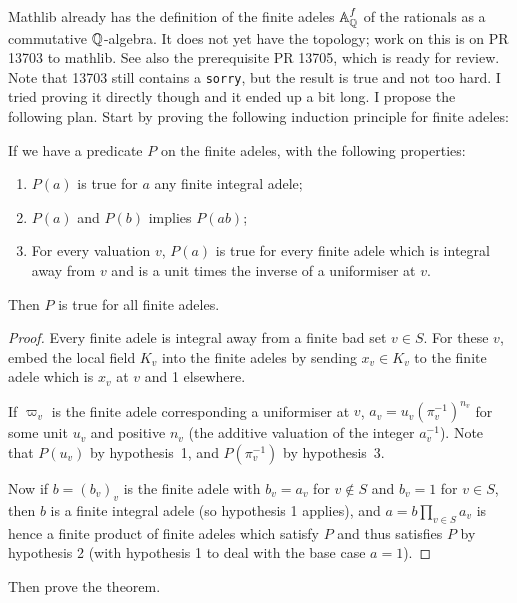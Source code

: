 Mathlib already has the definition of the finite adeles $\mathbb{A}_{\mathbb{Q}}^f$ of the rationals as a
commutative $\mathbb{Q}$-algebra. It does not yet have the topology; work on this is on PR 13703 to mathlib.
See also the prerequisite PR 13705, which is ready for review. Note that 13703 still contains a
{\tt sorry}, but the result is true and not too hard. I tried proving it directly though and it ended
up a bit long. I propose the following plan. Start by proving the following induction principle for
finite adeles:
\begin{lemma}
    \label{DedekindDomain.FiniteAdeleRing.mul_induction_on}
    \leanok
    If we have a predicate $P$ on the finite adeles, with the following properties:
  \begin{enumerate}
    \item $P(a)$ is true for $a$ any finite integral adele;
    \item $P(a)$ and $P(b)$ implies $P(ab)$;
    \item For every valuation $v$, $P(a)$ is true for every finite adele which is integral
      away from $v$ and is a unit times the inverse of a uniformiser at $v$.
  \end{enumerate}
  Then $P$ is true for all finite adeles.
\end{lemma}
\begin{proof}
  Every finite adele is integral away from a finite bad set $v\in S$. For these $v$,
  embed the local field $K_v$ into the finite adeles by sending $x_v\in K_v$ to the
  finite adele which is $x_v$ at $v$ and 1 elsewhere.

  If $\varpi_v$ is the finite adele corresponding a uniformiser at $v$,
  $a_v=u_v(\pi_v^{-1})^{n_v}$ for some unit $u_v$ and positive $n_v$ (the additive valuation
  of the integer $a_v^{-1}$). Note that $P(u_v)$ by hypothesis~1, and
  $P(\pi_v^{-1})$ by hypothesis~3.

  Now if $b=(b_v)_v$ is the finite adele with $b_v=a_v$ for $v\not\in S$ and $b_v=1$ for $v\in S$,
  then $b$ is a finite integral adele (so hypothesis 1 applies), and $a=b\prod_{v\in S}a_v$ is hence
  a finite product of finite adeles which satisfy $P$ and thus satisfies $P$ by hypothesis 2
  (with hypothesis 1 to deal with the base case $a=1$).
\end{proof}

Then prove the theorem.

